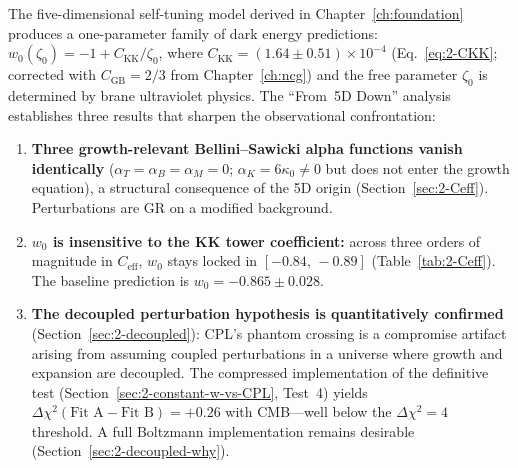 The five-dimensional self-tuning model derived in Chapter~\ref{ch:foundation} produces a one-parameter family of dark energy predictions: $w_0(\zeta_0) = -1 + C_\mathrm{KK}/\zeta_0$, where $C_\mathrm{KK} = (1.64 \pm 0.51) \times 10^{-4}$ (Eq.~\ref{eq:2-CKK}; corrected with $C_\mathrm{GB} = 2/3$ from Chapter~\ref{ch:ncg}) and the free parameter $\zeta_0$ is determined by brane ultraviolet physics. The ``From~5D Down'' analysis establishes three results that sharpen the observational confrontation:
\begin{enumerate}
  \item \textbf{Three growth-relevant Bellini--Sawicki alpha functions vanish identically} ($\alpha_T = \alpha_B = \alpha_M = 0$; $\alpha_K = 6\kappa_0 \neq 0$ but does not enter the growth equation), a structural consequence of the 5D origin (Section~\ref{sec:2-Ceff}). Perturbations are GR on a modified background.
  \item \textbf{$w_0$ is insensitive to the KK tower coefficient:} across three orders of magnitude in $C_\mathrm{eff}$, $w_0$ stays locked in $[-0.84,\, -0.89]$ (Table~\ref{tab:2-Ceff}). The baseline prediction is $w_0 = -0.865 \pm 0.028$.
  \item \textbf{The decoupled perturbation hypothesis is quantitatively confirmed} (Section~\ref{sec:2-decoupled}): CPL's phantom crossing is a compromise artifact arising from assuming coupled perturbations in a universe where growth and expansion are decoupled. The compressed implementation of the definitive test (Section~\ref{sec:2-constant-w-vs-CPL}, Test~4) yields $\Delta\chi^2(\text{Fit~A} - \text{Fit~B}) = +0.26$ with CMB---well below the $\Delta\chi^2 = 4$ threshold. A full Boltzmann implementation remains desirable (Section~\ref{sec:2-decoupled-why}).
\end{enumerate}


